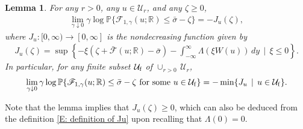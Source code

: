 \documentclass[12pt]{amsart}
\newtheorem{lemma}{Lemma}
\begin{document}
\begin{lemma} \label{L: basic LDP} For any $r > 0$, any $u \in \mathcal{U}_{r}$, and any $\zeta \geq 0$, 
		\begin{align} \label{E: LDP most basic form}
			\lim_{\gamma \downarrow 0} \gamma \log \mathbb{P} \{ \mathscr{F}_{1,\gamma}(u; \mathbb{R}) \leq \bar{\sigma} - \zeta \} = -J_{u}(\zeta),
		\end{align}
	where $J_{u} : [0,\infty) \to [0,\infty]$ is the nondecreasing function given by 
		\begin{align}\label{E: definition of Ju}
			J_{u}(\zeta) = \sup \left\{ - \xi ( \zeta + \bar{\mathscr{F}}(u; \mathbb{R}) - \bar{\sigma}) - \int_{-\infty}^{\infty} \Lambda ( \xi W(u) ) \, dy \, \mid \, \xi \leq 0 \right\}.
		\end{align}
	In particular, for any finite subset $\mathcal{U}_{ \rm f } $ of $ \cup_{ r > 0 } \, \mathcal{U}_{r}$,
		\begin{align*}
			\lim_{ \gamma \downarrow 0 } \gamma \log \mathbb{P} \{ \mathscr{F}_{1,\gamma} ( u ; \mathbb{R} ) \leq \bar{\sigma} - \zeta \, \, \text{for some} \, \, u \in \mathcal{U}_{ \rm f } \} = - \min \{ J_{u} \, \mid \, u \in \mathcal{U}_{ \rm f } \}.
		\end{align*}
	\end{lemma} 

Note that the lemma implies that $J_{u}(\zeta) \geq 0$, which can also be deduced from the definition \eqref{E: definition of Ju} upon recalling that $\Lambda(0) = 0$.  
\end{document}
